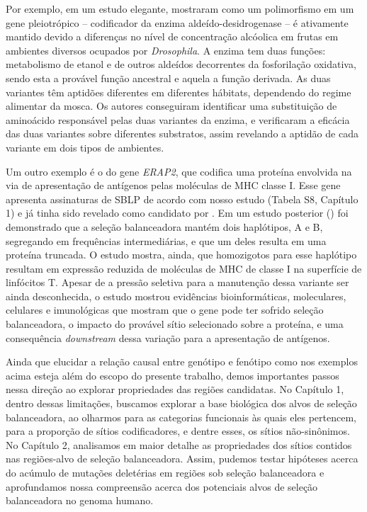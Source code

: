 \begin{refsection}
     Por exemplo, em um estudo elegante, \textcite{Chakraborty2015} mostraram como um polimorfismo em um gene pleiotrópico -- codificador da enzima aldeído-desidrogenase -- é ativamente mantido devido a diferenças no nível de concentração alcóolica em frutas em ambientes diversos ocupados por \emph{Drosophila}. A enzima tem duas funções: metabolismo de etanol e de outros aldeídos decorrentes da fosforilação oxidativa, sendo esta a provável função ancestral e aquela a função derivada.
As duas variantes têm aptidões diferentes em diferentes hábitats, dependendo do regime alimentar da mosca. Os autores conseguiram identificar uma substituição de aminoácido responsável pelas duas variantes da enzima, e verificaram a eficácia das duas variantes sobre diferentes substratos, assim revelando a aptidão de cada variante em dois tipos de ambientes.

Um outro exemplo é o do gene \emph{ERAP2}, que codifica uma proteína envolvida na via de apresentação de antígenos pelas moléculas de MHC classe I. Esse gene apresenta assinaturas  de SBLP de acordo com nosso estudo (Tabela S8, Capítulo 1) e já tinha sido revelado como candidato por \textcite{Andres2009}. Em um estudo posterior (\cite{Andres2010}) foi demonstrado que a seleção balanceadora mantém dois haplótipos, A e B, segregando em frequências intermediárias, e que um deles resulta em uma proteína truncada. O estudo mostra, ainda, que homozigotos para esse haplótipo resultam em expressão reduzida de moléculas de MHC de classe I na superfície de linfócitos T. Apesar de a pressão seletiva para a manutenção dessa variante ser ainda desconhecida, o estudo mostrou evidências bioinformáticas, moleculares, celulares e imunológicas que mostram que o gene pode ter sofrido seleção balanceadora, o impacto do provável sítio selecionado sobre a proteína, e uma consequência \emph{downstream} dessa variação para a apresentação de antígenos. 
  
  Ainda que elucidar a relação causal entre genótipo e fenótipo como nos exemplos acima esteja além do escopo do presente trabalho, demos importantes passos nessa direção ao explorar propriedades das regiões candidatas. No Capítulo 1, dentro dessas limitações, buscamos explorar a base biológica dos alvos de seleção balanceadora, ao olharmos para as categorias funcionais às quais eles pertencem, para a proporção de sítios codificadores, e dentre esses, os sítios não-sinônimos. No Capítulo 2, analisamos em maior detalhe as propriedades dos sítios contidos nas regiões-alvo de seleção balanceadora. Assim, pudemos testar hipóteses acerca do acúmulo de mutações deletérias em regiões sob seleção balanceadora e aprofundamos nossa compreensão acerca dos potenciais alvos de seleção balanceadora no genoma humano.
  

\end{refsection}
